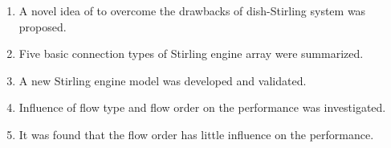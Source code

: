 \documentclass[12pt]{letter}
\begin{document}
\begin{enumerate}
\item A novel idea of to overcome the drawbacks of dish-Stirling system was proposed.

\item Five basic connection types of Stirling engine array were summarized.

\item A new Stirling engine model was developed and validated.

\item Influence of flow type and flow order on the performance was investigated.

\item It was found that the flow order has little influence on the performance.
\end{enumerate}
\end{document}
